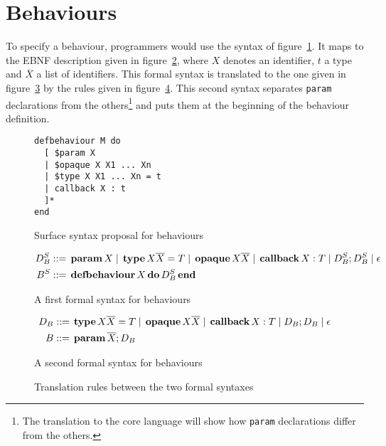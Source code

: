 \documentclass[a4paper,12pt]{article}
\author{Aghilas Y. Boussaa}
\newcommand{\kw}[1]{%
  \,\text{\textbf{#1}}\,
}
\newcommand{\pipe}{%
\; | \;
}
\begin{document}
\section{Behaviours}
To specify a behaviour, programmers would use the syntax of
figure~\ref{behaviour-surface}. It maps to the EBNF description given in
figure~\ref{behaviour-formal1}, where $X$ denotes an identifier, $t$ a type and
$\overline{X}$ a list of identifiers. This formal syntax is translated to the
one given in figure~\ref{behaviour-formal2} by the rules given in
figure~\ref{behaviour-formal1to2}. This second syntax separates \texttt{param}
declarations from the others\footnote{The translation to the core language will
show how \texttt{param} declarations differ from the others.} and puts them at
the beginning of the behaviour definition.
\begin{figure}[h]
\begin{verbatim}
defbehaviour M do
  [ $param X
  | $opaque X X1 ... Xn
  | $type X X1 ... Xn = t
  | callback X : t
  ]*
end
\end{verbatim}
\caption{Surface syntax proposal for behaviours}\label{behaviour-surface}
\end{figure}
\begin{figure}[h]
  \begin{align*}D_B^S &::= \kw{param} X \pipe \kw{type} X \overline{X} = T \pipe \kw{opaque} X
  \overline{X} \pipe \kw{callback} X:T \pipe D_B^S ; D_B^S \pipe \epsilon \\
  B^S &::= \kw{defbehaviour} X \kw{do} D_B^S \kw{end}
  \end{align*}
  \caption{A first formal syntax for behaviours}\label{behaviour-formal1}
\end{figure}
\begin{figure}[h]
  \begin{align*}D_B &::= \kw{type} X \overline{X} = T \pipe \kw{opaque} X
  \overline{X} \pipe \kw{callback} X:T \pipe D_B ; D_B \pipe \epsilon \\
  B &::= \kw{param} \overline{X}; D_B
  \end{align*}
  \caption{A second formal syntax for behaviours}\label{behaviour-formal2}
\end{figure}
\begin{figure}[h]
  \caption{Translation rules between the two formal syntaxes}\label{behaviour-formal1to2}
\end{figure}
\end{document}
